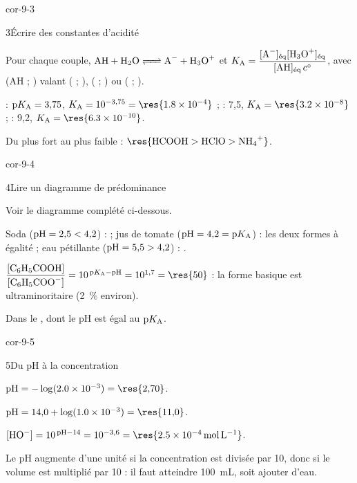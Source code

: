 \begin{blocLivre}{cor-9-3}
\begin{corrige}{3}{Écrire des constantes d'acidité}
\begin{questions}
\item Pour chaque couple, $\ce{AH + H2O <=> A- + H3O+}$ et $K_\mathrm{A}=\dfrac{[\ce{A-}]_\text{éq}[\ce{H3O+}]_\text{éq}}{[\ce{AH}]_\text{éq}\,\cst}$,
avec (AH ; ) valant ( ; ), ( ; ) ou ( ; ).
\item {} : $\mathrm{p}K_{\mathrm{A}}=3{,}75$, $K_\mathrm{A}=10^{-3{,}75}=\res{\num{1.8e-4}}$ ;  : 7,5,
$K_\mathrm{A}=\res{\num{3.2e-8}}$ ;  : 9,2, $K_\mathrm{A}=\res{\num{6.3e-10}}$.
\item Du plus fort au plus faible : $\res{\ce{HCOOH}>\ce{HClO}>\ce{NH4+}}$.
\end{questions}
\end{corrige}
\end{blocLivre}
\begin{blocLivre}{cor-9-4}
\begin{corrige}{4}{Lire un diagramme de prédominance}
\begin{questions}
\item Voir le diagramme complété ci-dessous.
\item Soda ($\mathrm{pH}=2{,}5<4{,}2$) :  ; jus de tomate ($\mathrm{pH}=4{,}2=\mathrm{p}K_{\mathrm{A}}$) : les deux formes à égalité ;
eau pétillante ($\mathrm{pH}=5{,}5>4{,}2$) : .
\item $\dfrac{[\ce{C6H5COOH}]}{[\ce{C6H5COO-}]}=10^{\,\pKa-\pH}=10^{1{,}7}=\res{50}$ : la forme basique est
ultraminoritaire (2~\% environ).
\item Dans le , dont le pH est égal au $\mathrm{p}K_{\mathrm{A}}$.
\end{questions}
\end{corrige}
\end{blocLivre}
\begin{blocLivre}{cor-9-5}
\begin{corrige}{5}{Du pH à la concentration}
\begin{questions}
\item $\pH=-\log(\num{2.0e-3})=\res{2{,}70}$.
\item $\pH=14{,}0+\log(\num{1.0e-3})=\res{11{,}0}$.
\item $[\ce{HO-}]=10^{\,\pH-14}=10^{-3{,}6}=\res{\qty{2,5e-4}{mol.L^{-1}}}$.
\item Le pH augmente d'une unité si la concentration est divisée par 10, donc si le volume est multiplié par 10 :
il faut atteindre 100~mL, soit ajouter  d'eau.
\end{questions}
\end{corrige}
\end{blocLivre}
